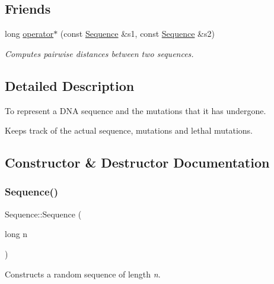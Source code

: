 \subsection*{Friends}
\begin{DoxyCompactItemize}
\item 
long \mbox{\hyperlink{classrcombinator_1_1Sequence_abdc71a8f6617dcb6ab73f0e07eb63b67}{operator$\ast$}} (const \mbox{\hyperlink{classrcombinator_1_1Sequence}{Sequence}} \&s1, const \mbox{\hyperlink{classrcombinator_1_1Sequence}{Sequence}} \&s2)
\begin{DoxyCompactList}\small\item\em Computes pairwise distances between two sequences. \end{DoxyCompactList}\end{DoxyCompactItemize}


\subsection{Detailed Description}
To represent a D\+NA sequence and the mutations that it has undergone. 

Keeps track of the actual sequence, mutations and lethal mutations. 

\subsection{Constructor \& Destructor Documentation}
\mbox{\label{classrcombinator_1_1Sequence_afab8bafaf1283f4e699ba9111ee452b3}} 
\subsubsection{\texorpdfstring{Sequence()}{Sequence()}\hspace{0.1cm}{\footnotesize\ttfamily [1/3]}}
{\footnotesize\ttfamily Sequence\+::\+Sequence (\begin{DoxyParamCaption}\item[{long}]{n }\end{DoxyParamCaption})}



Constructs a random sequence of length {\itshape n}. 

